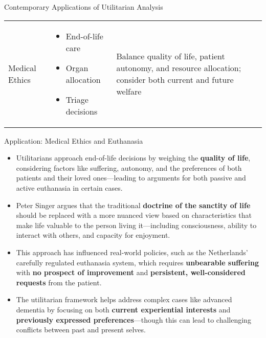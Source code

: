\documentclass[aspectratio=169]{beamer}
\begin{document}
\begin{frame}{Contemporary Applications of Utilitarian Analysis}
\begin{table}[]
\begin{tabular}{p{2.2cm}p{3.5cm}p{3.5cm}}
            Medical Ethics & \begin{itemize}\setlength\itemsep{0em}
                \item End-of-life care
                \item Organ allocation
                \item Triage decisions
            \end{itemize} & 
            Balance quality of life, patient autonomy, and resource allocation; consider both current and future welfare
        \end{tabular}
    \end{table}
\end{frame}

\begin{frame}{Application: Medical Ethics and Euthanasia}
    \begin{itemize}
        \item Utilitarians approach end-of-life decisions by weighing the \textbf{quality of life}, considering factors like suffering, autonomy, and the preferences of both patients and their loved ones—leading to arguments for both passive and active euthanasia in certain cases.
        
        \item Peter Singer argues that the traditional \textbf{doctrine of the sanctity of life} should be replaced with a more nuanced view based on characteristics that make life valuable to the person living it—including consciousness, ability to interact with others, and capacity for enjoyment.
        
        \item This approach has influenced real-world policies, such as the Netherlands' carefully regulated euthanasia system, which requires \textbf{unbearable suffering} with \textbf{no prospect of improvement} and \textbf{persistent, well-considered requests} from the patient.
        
        \item The utilitarian framework helps address complex cases like advanced dementia by focusing on both \textbf{current experiential interests} and \textbf{previously expressed preferences}—though this can lead to challenging conflicts between past and present selves.
    \end{itemize}
\end{frame}
\end{document}
